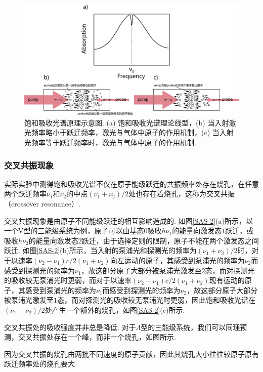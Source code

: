 \documentclass[UTF8,a4paper,10pt]{article}
\begin{document}
\begin{figure}[h]
    \centering
    \includegraphics[width=.9\textwidth]{SAS-1.png}
    \caption{饱和吸收光谱原理示意图. (a) 饱和吸收光谱理论线型，(b) 当入射激光频率略小于跃迁频率，激光与气体中原子的作用机制，(c) 当入射光频率等于跃迁频率时，激光与气体中原子的作用机制.}
    \label{SAS-1}
\end{figure}

\subsubsection{交叉共振现象}

实际实验中测得饱和吸收光谱不仅在原子能级跃迁的共振频率处存在烧孔，在任意两个跃迁频率$\nu_1$和$\nu_2$的中点$(\nu_1+\nu_2)/2$处也存在着烧孔，这称为交叉共振（crossover resonance）.

交叉共振现象是由原子不同能级跃迁的相互影响造成的. 如图\ref{SAS-2}(a)所示，以一个V型的三能级系统为例，原子可以由基态$0$吸收$h\nu_1$的能量向激发态$1$跃迁，或吸收$h\nu_2$的能量向激发态$2$跃迁，由于选择定则的限制，原子不能在两个激发态之间跃迁. 如图\ref{SAS-2}(b)所示，当入射的泵浦光和探测光的频率为$(\nu_1+\nu_2)/2$时，对于以速率$(\nu_2-\nu_1)c/2(\nu_1+\nu_2)$向左运动的原子，其感受到泵浦光的频率为$\nu_2$而感受到探测光的频率为$\nu_1$，故这部分原子大部分被泵浦光激发至$2$态，而对探测光的吸收较无泵浦光时更弱，而对于以速率$(\nu_2-\nu_1)c/2(\nu_1+\nu_2)$现有运动的原子，其感受到泵浦光的频率为$\nu_1$而感受到探测光的频率为$\nu_2$，故这部分原子大部分被泵浦光激发至$1$态，而对探测光的吸收较无泵浦光时更弱，因此饱和吸收光谱在$(\nu_1+\nu_2)/2$处产生一个额外的烧孔，如图\ref{SAS-2}(c)所示.

交叉共振处的吸收强度并非总是降低. 对于$\Lambda$型的三能级系统，我们可以同理预测，交叉共振处存在一个峰，而非一个烧孔，如图所示.

因为交叉共振的烧孔由两批不同速度的原子贡献，因此其烧孔大小往往较原子原有跃迁频率处的烧孔要大.
\end{document}
